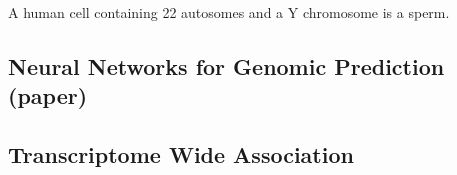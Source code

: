 \begin{quest}
\item
	A human cell containing 22 autosomes and a Y chromosome is a sperm.


\end{quest}



\subsection{Neural Networks for Genomic Prediction (paper) \cite{pinto2019can}}

\subsection{Transcriptome Wide Association}

